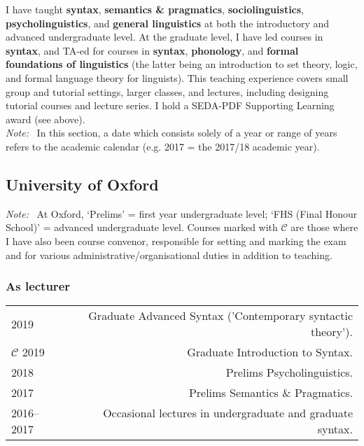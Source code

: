 \documentclass[11pt,a4paper]{article}
\makeatletter
\newenvironment{cvsection}{%
  \setlength{\extrarowheight}{0.70ex}
  \begin{longtable}[l]{@{} L R @{}}
}{%
  \end{longtable}
}
\newcommand{\note}{\emph{Note: }}
\newcommand{\conv}{
$\mathcal{C}$\hfill%
}
\makeatother
\begin{document}
I have taught \textbf{syntax}, \textbf{semantics \& pragmatics}, \textbf{sociolinguistics}, \textbf{psycholinguistics}, and \textbf{general linguistics} at both the introductory and advanced undergraduate level. At the graduate level, I have led courses in \textbf{syntax}, and TA-ed for courses in \textbf{syntax}, \textbf{phonology}, and \textbf{formal foundations of linguistics} (the latter being an introduction to set theory, logic, and formal language theory for linguists). This teaching experience covers small group and tutorial settings, larger classes, and lectures, including designing tutorial courses and lecture series. I hold a SEDA-PDF Supporting Learning award (see above).
\\[1em]
\note\ In this section, a date which consists solely of a year or range of years refers to the academic calendar (e.g. 2017 = the 2017/18 academic year).

\subsection*{University of Oxford}
\note\ At Oxford, `Prelims' = first year undergraduate level; `FHS (Final Honour School)' = advanced undergraduate level. Courses marked with $\mathcal{C}$ are those where I have also been course convenor, responsible for setting and marking the exam and for various administrative\slash organisational duties in addition to teaching.

\subsubsection*{As lecturer}
\begin{cvsection}
    2019        & Graduate Advanced Syntax ('Contemporary syntactic theory').\\
    \conv2019        & Graduate Introduction to Syntax.\\
    2018        & Prelims Psycholinguistics.\\
    2017        & Prelims Semantics \& Pragmatics.\\
    2016--2017  & Occasional lectures in undergraduate and graduate syntax.
\end{cvsection}
\end{document}
